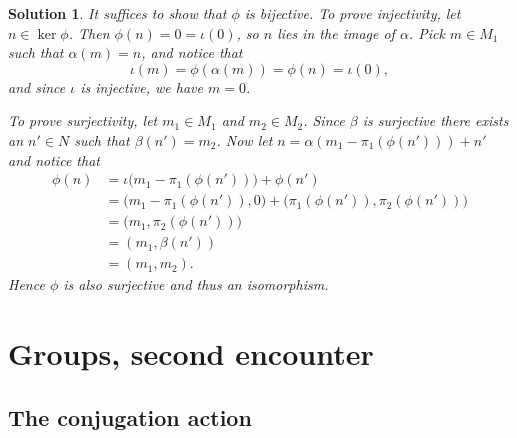\documentclass[article, a4paper, 11pt, oneside]{memoir}
\numberwithin{equation}{chapter}
\theoremstyle{nonumberplain}
\newtheorem{solution}{Solution}
\begin{document}
\begin{solution}
    It suffices to show that $\phi$ is bijective. To prove injectivity, let $n \in \ker\phi$. Then $\phi(n) = 0 = \iota(0)$, so $n$ lies in the image of $\alpha$. Pick $m \in M_1$ such that $\alpha(m) = n$, and notice that
    \begin{equation*}
        \iota(m)
            = \phi(\alpha(m))
            = \phi(n)
            = \iota(0),
    \end{equation*}
    and since $\iota$ is injective, we have $m = 0$.

    To prove surjectivity, let $m_1 \in M_1$ and $m_2 \in M_2$. Since $\beta$ is surjective there exists an $n' \in N$ such that $\beta(n') = m_2$. Now let $n = \alpha(m_1 - \pi_1(\phi(n'))) + n'$ and notice that
    \begin{align*}
        \phi(n)
            &= \iota \bigl( m_1 - \pi_1(\phi(n')) \bigr) + \phi(n') \\
            &= \bigl( m_1 - \pi_1(\phi(n')), 0 \bigr) + \bigl( \pi_1(\phi(n')), \pi_2(\phi(n')) \bigr) \\
            &= \bigl( m_1, \pi_2(\phi(n')) \bigr) \\
            &= (m_1, \beta(n')) \\
            &= (m_1, m_2).
    \end{align*}
    Hence $\phi$ is also surjective and thus an isomorphism.
\end{solution}



\chapter{Groups, second encounter}

\section{The conjugation action}
\end{document}
